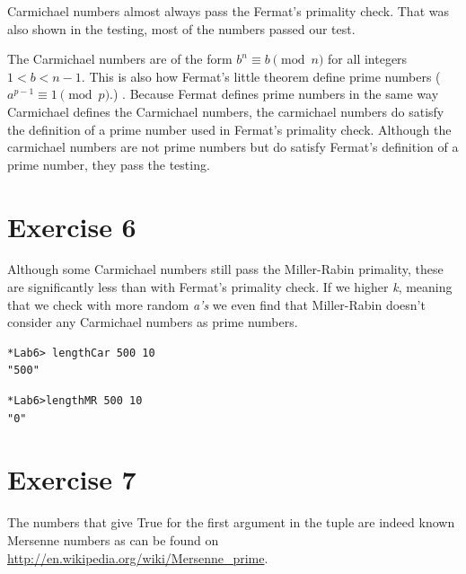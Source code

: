 \documentclass{article}
\begin{document}


Carmichael numbers almost always pass the Fermat's primality check. That was also shown in the testing, most of the numbers passed our test.
 
The Carmichael numbers are of the form $ b^{n}\equiv b\pmod{n} $ for all integers $1<b<n-1 $. This is also how Fermat's little theorem define prime numbers ( $a^{p-1} \equiv 1 \pmod p.$) . Because Fermat defines prime numbers in the same way Carmichael defines the Carmichael numbers, the carmichael numbers do satisfy the definition of a prime number used in Fermat's primality check. Although the carmichael numbers are not prime numbers but do satisfy Fermat's definition of a prime number, they pass the testing.
\vspace{0.5cm}

\section*{Exercise 6}


Although some Carmichael numbers still pass the Miller-Rabin primality, these are significantly less than with Fermat's primality check. If we higher \emph{k}, meaning that we check with more random \emph{a's} we even find that Miller-Rabin doesn't consider any Carmichael numbers as prime numbers.


\begin{verbatim}
*Lab6> lengthCar 500 10
"500"
\end{verbatim}

\begin{verbatim}
*Lab6>lengthMR 500 10
"0"
\end{verbatim}

\section*{Exercise 7}


The numbers that give True for the first argument in the tuple are indeed known Mersenne numbers as can be found on \url{http://en.wikipedia.org/wiki/Mersenne_prime}.
\end{document}
